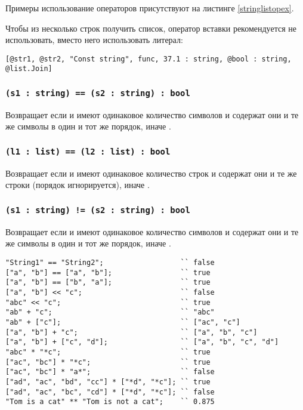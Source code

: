 Примеры использование операторов присутствуют на листинге \ref{stringlistopex}.

Чтобы из несколько строк получить список, оператор вставки рекомендуется не использовать, вместо него использовать литерал:
\begin{lstlisting}[numbers=none]
[@str1, @str2, "Const string", func, 37.1 : string, @bool : string, @list.Join]
\end{lstlisting}

\subsubsection{\lstinline|(s1 : string) == (s2 : string) : bool|}

Возвращает \true{} если  и  имеют одинаковое количество символов и содержат они и те же символы в один и тот же порядок, иначе \false{}.

\subsubsection{\lstinline|(l1 : list) == (l2 : list) : bool|}

Возвращает \true{} если  и  имеют одинаковое количество строк и содержат они и те же строки (порядок игнорируется), иначе \false{}.

\subsubsection{\lstinline|(s1 : string) != (s2 : string) : bool|}

Возвращает \false{} если  и  имеют одинаковое количество символов и содержат они и те же символы в один и тот же порядок, иначе \true{}.

\begin{lstlisting}[caption=Примеры использования операторов над данными типа string и list, label=stringlistopex]
"String1" == "String2";					 `` false
["a", "b"] == ["a", "b"];				 `` true
["a", "b"] == ["b", "a"];				 `` true
["a", "b"] << "c";						 `` false
"abc" << "c";							 `` true
"ab" + "c";								 `` "abc"
"ab" + ["c"];							 `` ["ac", "c"]
["a", "b"] + "c";						 `` ["a", "b", "c"]
["a", "b"] + ["c", "d"];				 `` ["a", "b", "c", "d"]
"abc" * "*c";							 `` true
["ac", "bc"] * "*c";					 `` true
["ac", "bc"] * "a*";					 `` false
["ad", "ac", "bd", "cc"] * ["*d", "*c"]; `` true
["ad", "ac", "bc", "cd"] * ["*d", "*c"]; `` false
"Tom is a cat" ** "Tom is not a cat";	 `` 0.875
\end{lstlisting}

